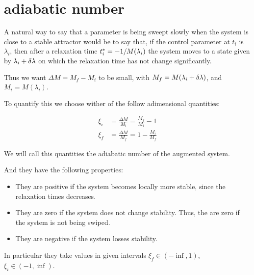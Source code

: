 	\section{adiabatic number}

A natural way to say that a parameter is being sweept slowly when  the system is close to a stable attractor would be to say that, if the control parameter at $t_i$ is $\lambda_i$, then after a relaxation time $t^*_i=-1/M(\lambda_i)$ the system moves to a state given by  $\lambda_i+\delta \lambda$ on which the relaxation time has not change significantly. 

Thus we want $\Delta M=M_f-M_i$ to be small, with $M_f=M(\lambda_i+\delta \lambda)$, and $M_i= M(\lambda_i) $.

To quantify this we choose wither of the follow adimensional quantities:

\begin{equation}
	\begin{aligned}
		\xi_i&=\frac{\Delta M}{M_i}=\frac{M_f}{M_i}-1 \\
		\xi_f&=\frac{\Delta M}{M_f}=1-\frac{M_i}{M_f}
	\end{aligned}
	\label{eq:xi}
\end{equation}

We will call this quantities the adiabatic number of the augmented system. 

And they have the following properties:
\begin{itemize}
	\item They are positive if the system becomes locally more stable, since the relaxation times decreases. 
	\item They are zero if the system does not change stability. Thus, the are zero if the system is not being swiped.
	\item They are negative if the system losses stability.
\end{itemize}

In particular they take values in given intervals $\xi_f  \in (-\inf,1)$, $\xi_i  \in (-1,\inf)$.





